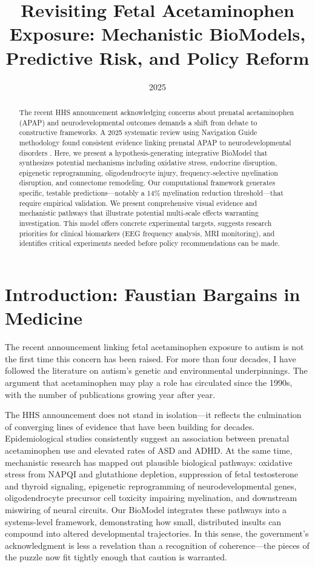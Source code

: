\documentclass[11pt]{article}
\title{Revisiting Fetal Acetaminophen Exposure: Mechanistic BioModels, Predictive Risk, and Policy Reform}
\author{}
\date{2025}
\let\oldsection\section
\renewcommand{\section}[1]{\oldsection{#1}\setlength{\leftskip}{0em}}
\begin{document}
\maketitle 

\begin{abstract}
The recent HHS announcement acknowledging concerns about prenatal acetaminophen (APAP) and neurodevelopmental outcomes demands a shift from debate to constructive frameworks. A 2025 systematic review using Navigation Guide methodology found consistent evidence linking prenatal APAP to neurodevelopmental disorders \citep{navarro2025}. Here, we present a hypothesis-generating integrative BioModel that synthesizes potential mechanisms including oxidative stress, endocrine disruption, epigenetic reprogramming, oligodendrocyte injury, frequency-selective myelination disruption, and connectome remodeling. Our computational framework generates specific, testable predictions—notably a 14\% myelination reduction threshold—that require empirical validation. We present comprehensive visual evidence and mechanistic pathways that illustrate potential multi-scale effects warranting investigation. This model offers concrete experimental targets, suggests research priorities for clinical biomarkers (EEG frequency analysis, MRI monitoring), and identifies critical experiments needed before policy recommendations can be made.
\end{abstract}

\section{Introduction: Faustian Bargains in Medicine}

The recent announcement linking fetal acetaminophen exposure to autism is not the first time this concern has been raised. For more than four decades, I have followed the literature on autism's genetic and environmental underpinnings. The argument that acetaminophen may play a role has circulated since the 1990s, with the number of publications growing year after year. 

The HHS announcement does not stand in isolation—it reflects the culmination of converging lines of evidence that have been building for decades. Epidemiological studies consistently suggest an association between prenatal acetaminophen use and elevated rates of ASD and ADHD. At the same time, mechanistic research has mapped out plausible biological pathways: oxidative stress from NAPQI and glutathione depletion, suppression of fetal testosterone and thyroid signaling, epigenetic reprogramming of neurodevelopmental genes, oligodendrocyte precursor cell toxicity impairing myelination, and downstream miswiring of neural circuits. Our BioModel integrates these pathways into a systems-level framework, demonstrating how small, distributed insults can compound into altered developmental trajectories. In this sense, the government's acknowledgment is less a revelation than a recognition of coherence—the pieces of the puzzle now fit tightly enough that caution is warranted.
\end{document}
